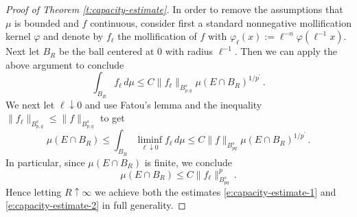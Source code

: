 \documentclass[11pt,reqno]{amsart}
\theoremstyle{definition}
\numberwithin{equation}{section}
\begin{document}
\begin{proof}[Proof of Theorem \ref{t:capacity-estimate}]
In order to remove the assumptions that $\mu$ is bounded and $f$ continuous, consider first a standard nonnegative mollification kernel $\varphi$ and denote by $f_\ell$ the mollification of $f$ with $\varphi_\ell (x):= \ell^{-n} \varphi (\ell^{-1} x)$. Next let $B_R$ be the ball centered at $0$ with radius $\ell^{-1}$. Then we can apply the above argument to conclude
\[
\int_{B_R} f_{\ell}\,d\mu\le C\|f_{\ell}\|_{B^s_{p,q}}\mu(E\cap B_R)^{1/p^\prime}\, .
\]
We next let $\ell \downarrow 0$ and use Fatou's lemma and the inequality $\|f_{\ell}\|_{B^{s}_{p,q}}\le\|f\|_{B^{s}_{p,q}}$ to get
\[
\mu (E\cap B_R) \leq \int_{B_R} \liminf_{\ell \downarrow 0} f_{\ell}\, d\mu \leq C \|f\|_{B^s_{pq}}\mu (E\cap B_R)^{1/p^\prime}\, .
\]
In particular, since $\mu (E\cap B_R)$ is finite, we conclude
\[
\mu (E\cap B_R) \leq C \|f_\ell\|_{B^s_{pq}}^p\, .
\]
Hence letting $R\uparrow \infty$ we achieve both the estimates \eqref{e:capacity-estimate-1} and \eqref{e:capacity-estimate-2} in full generality.
\end{proof}
\end{document}
